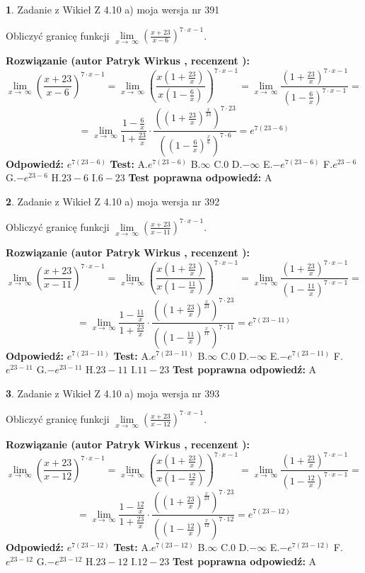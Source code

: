 \documentclass[12pt, a4paper]{article}
\theoremstyle{definition} %
\newtheorem{zad}{}
\newcommand{\zadStart}[1]{\begin{zad}#1\newline}
\newcommand{\zadStop}{\end{zad}}
\newcommand{\rozwStart}[2]{\noindent \textbf{Rozwiązanie (autor #1 , recenzent #2): }\newline}
\newcommand{\rozwStop}{\newline}
\newcommand{\odpStart}{\noindent \textbf{Odpowiedź:}\newline}
\newcommand{\odpStop}{\newline}
\newcommand{\testStart}{\noindent \textbf{Test:}\newline}
\newcommand{\testStop}{\newline}
\newcommand{\kluczStart}{\noindent \textbf{Test poprawna odpowiedź:}\newline}
\newcommand{\kluczStop}{\newline}
\begin{document}
\zadStart{Zadanie z Wikieł Z 4.10 a) moja wersja nr 391}


Obliczyć granicę funkcji  $\lim\limits_{x\to\ \infty}(\frac{x+23}{x-6})^{7\cdot x-1}$.
\zadStop
\rozwStart{Patryk Wirkus}{}
$$\lim\limits_{x\to\ \infty}(\frac{x+23}{x-6})^{7\cdot x-1} = \lim\limits_{x\to\ \infty}(\frac{x(1+\frac{23}{x})}{x(1-\frac{6}{x})})^{7\cdot x-1}=\lim\limits_{x\to\ \infty}\frac{(1+\frac{23}{x})^{7\cdot x-1}}{(1-\frac{6}{x})^{7\cdot x-1}}=$$
$$=\lim\limits_{x\to\ \infty}\frac{1-\frac{6}{x}}{1+\frac{23}{x}}\cdot\frac{((1+\frac{23}{x})^{\frac{x}{23}})^{7\cdot23}}{((1-\frac{6}{x})^{\frac{x}{6}})^{7\cdot6}}=e^{7(23-6)}$$
\rozwStop
\odpStart
$e^{7(23-6)}$
\odpStop
\testStart
A.$e^{7(23-6)}$ B.$\infty$ C.$0$ D.$-\infty$ E.$-e^{7(23-6)}$
F.$e^{23-6}$ G.$-e^{23-6}$
H.$23-6$
I.$6-23$
\testStop
\kluczStart
A
\kluczStop



\zadStart{Zadanie z Wikieł Z 4.10 a) moja wersja nr 392}


Obliczyć granicę funkcji  $\lim\limits_{x\to\ \infty}(\frac{x+23}{x-11})^{7\cdot x-1}$.
\zadStop
\rozwStart{Patryk Wirkus}{}
$$\lim\limits_{x\to\ \infty}(\frac{x+23}{x-11})^{7\cdot x-1} = \lim\limits_{x\to\ \infty}(\frac{x(1+\frac{23}{x})}{x(1-\frac{11}{x})})^{7\cdot x-1}=\lim\limits_{x\to\ \infty}\frac{(1+\frac{23}{x})^{7\cdot x-1}}{(1-\frac{11}{x})^{7\cdot x-1}}=$$
$$=\lim\limits_{x\to\ \infty}\frac{1-\frac{11}{x}}{1+\frac{23}{x}}\cdot\frac{((1+\frac{23}{x})^{\frac{x}{23}})^{7\cdot23}}{((1-\frac{11}{x})^{\frac{x}{11}})^{7\cdot11}}=e^{7(23-11)}$$
\rozwStop
\odpStart
$e^{7(23-11)}$
\odpStop
\testStart
A.$e^{7(23-11)}$ B.$\infty$ C.$0$ D.$-\infty$ E.$-e^{7(23-11)}$
F.$e^{23-11}$ G.$-e^{23-11}$
H.$23-11$
I.$11-23$
\testStop
\kluczStart
A
\kluczStop



\zadStart{Zadanie z Wikieł Z 4.10 a) moja wersja nr 393}


Obliczyć granicę funkcji  $\lim\limits_{x\to\ \infty}(\frac{x+23}{x-12})^{7\cdot x-1}$.
\zadStop
\rozwStart{Patryk Wirkus}{}
$$\lim\limits_{x\to\ \infty}(\frac{x+23}{x-12})^{7\cdot x-1} = \lim\limits_{x\to\ \infty}(\frac{x(1+\frac{23}{x})}{x(1-\frac{12}{x})})^{7\cdot x-1}=\lim\limits_{x\to\ \infty}\frac{(1+\frac{23}{x})^{7\cdot x-1}}{(1-\frac{12}{x})^{7\cdot x-1}}=$$
$$=\lim\limits_{x\to\ \infty}\frac{1-\frac{12}{x}}{1+\frac{23}{x}}\cdot\frac{((1+\frac{23}{x})^{\frac{x}{23}})^{7\cdot23}}{((1-\frac{12}{x})^{\frac{x}{12}})^{7\cdot12}}=e^{7(23-12)}$$
\rozwStop
\odpStart
$e^{7(23-12)}$
\odpStop
\testStart
A.$e^{7(23-12)}$ B.$\infty$ C.$0$ D.$-\infty$ E.$-e^{7(23-12)}$
F.$e^{23-12}$ G.$-e^{23-12}$
H.$23-12$
I.$12-23$
\testStop
\kluczStart
A
\kluczStop
\end{document}
